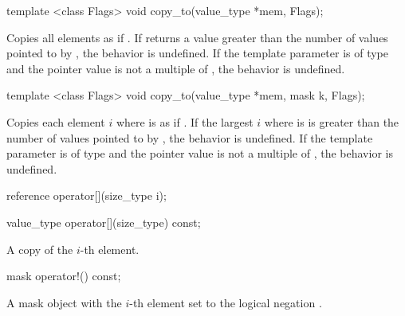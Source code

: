 \begin{itemdecl}
template <class Flags> void copy_to(value_type *mem, Flags);
\end{itemdecl}
\begin{itemdescr}
  \pnum\effects Copies all \mask elements as if  \foralli.
  \pnum\remarks If  returns a value greater than the number of values pointed to by , the behavior is undefined.
  \pnum\remarks If the  template parameter is of type  and the pointer value is not a multiple of , the behavior is undefined.
\end{itemdescr}

\begin{itemdecl}
template <class Flags> void copy_to(value_type *mem, mask k, Flags);
\end{itemdecl}
\begin{itemdescr}
  \pnum\effects Copies each \mask element $i$ where  is \true as if  \foralli.
  \pnum\remarks If the largest $i$ where  is \true is greater than the number of values pointed to by , the behavior is undefined.
  \pnum\remarks If the  template parameter is of type  and the pointer value is not a multiple of , the behavior is undefined.
\end{itemdescr}

\begin{itemdecl}
reference operator[](size_type i);
\end{itemdecl}
\begin{itemdescr}
  \dataparElementReference
\end{itemdescr}

\begin{itemdecl}
value_type operator[](size_type) const;
\end{itemdecl}
\begin{itemdescr}
  \pnum\returns A copy of the $i$-th element.
\end{itemdescr}

\begin{itemdecl}
mask operator!() const;
\end{itemdecl}
\begin{itemdescr}
  \pnum\returns A mask object with the $i$-th element set to the logical negation \foralli.
\end{itemdescr}

